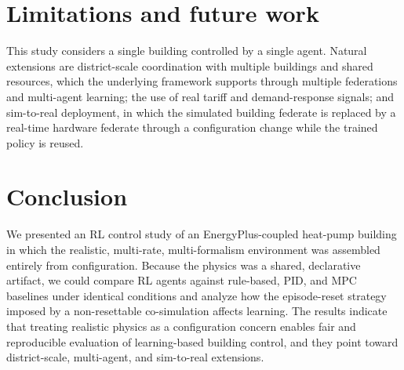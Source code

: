 \documentclass[preprint,review,12pt]{elsarticle}
\begin{document}
\section{Limitations and future work}\label{sec:future}
This study considers a single building controlled by a single agent. Natural
extensions are district-scale coordination with multiple buildings and shared
resources, which the underlying framework supports through multiple federations and
multi-agent learning; the use of real tariff and demand-response signals; and
sim-to-real deployment, in which the simulated building federate is replaced by a
real-time hardware federate through a configuration change while the trained policy
is reused.

\section{Conclusion}\label{sec:conclusion}
We presented an RL control study of an EnergyPlus-coupled heat-pump building in
which the realistic, multi-rate, multi-formalism environment was assembled entirely
from configuration. Because the physics was a shared, declarative artifact, we
could compare RL agents against rule-based, PID, and MPC baselines under identical
conditions and analyze how the episode-reset strategy imposed by a non-resettable
co-simulation affects learning. The results
indicate that treating realistic physics as a configuration concern enables fair
and reproducible evaluation of learning-based building control, and they point
toward district-scale, multi-agent, and sim-to-real extensions.


% 
\end{document}
